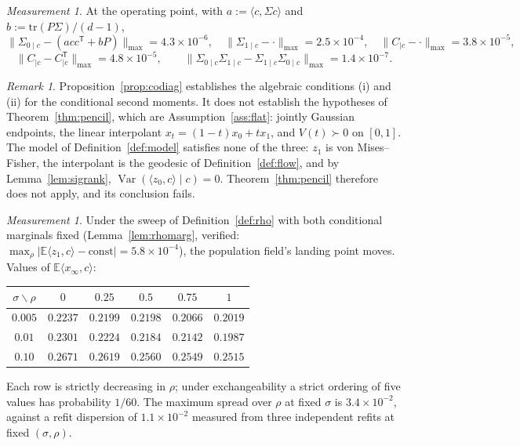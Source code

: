 \documentclass[11pt]{article}
\theoremstyle{definition}
\theoremstyle{remark}
\newtheorem{remark}[lemma]{Remark}
\newtheorem{measurement}[lemma]{Measurement}
\DeclareMathOperator{\Var}{Var}
\newcommand{\E}{\mathbb{E}}
\newcommand{\T}{\mathsf{T}}
\begin{document}
\begin{measurement}\label{meas:codiag}
At the operating point, with $a:=\langle c,\Sigma c\rangle$ and $b:=\mathrm{tr}(P\Sigma)/(d-1)$,
\[
\|\Sigma_{0\mid c}-(acc^{\T}+bP)\|_{\max}=4.3\times10^{-6},
\quad
\|\Sigma_{1\mid c}-\cdot\|_{\max}=2.5\times10^{-4},
\quad
\|C_{\mid c}-\cdot\|_{\max}=3.8\times10^{-5},
\]
\[
\|C_{\mid c}-C_{\mid c}^{\T}\|_{\max}=4.8\times10^{-5},
\qquad
\|\Sigma_{0\mid c}\Sigma_{1\mid c}-\Sigma_{1\mid c}\Sigma_{0\mid c}\|_{\max}=1.4\times10^{-7}.
\]
\end{measurement}

\begin{remark}\label{rem:nottransfer}
Proposition~\ref{prop:codiag} establishes the algebraic conditions (i) and (ii) for the
conditional second moments. It does not establish the hypotheses of Theorem~\ref{thm:pencil},
which are Assumption~\ref{ass:flat}: jointly Gaussian endpoints, the linear interpolant
$x_t=(1-t)x_0+tx_1$, and $V(t)\succ0$ on $[0,1]$. The model of Definition~\ref{def:model} satisfies
none of the three: $z_1$ is von Mises--Fisher, the interpolant is the geodesic of
Definition~\ref{def:flow}, and by Lemma~\ref{lem:sigrank}, $\Var(\langle z_0,c\rangle\mid c)=0$.
Theorem~\ref{thm:pencil} therefore does not apply, and its conclusion fails.
\end{remark}

\begin{measurement}\label{meas:nontransfer}
Under the sweep of Definition~\ref{def:rho} with both conditional marginals fixed
(Lemma~\ref{lem:rhomarg}, verified: $\max_\rho|\E\langle z_1,c\rangle-\text{const}|=5.8\times10^{-4}$),
the population field's landing point moves. Values of $\E\langle x_\infty,c\rangle$:
\begin{center}
\begin{tabular}{cccccc}
\toprule
$\sigma\backslash\rho$ & $0$ & $0.25$ & $0.5$ & $0.75$ & $1$\\
\midrule
$0.005$ & $0.2237$ & $0.2199$ & $0.2198$ & $0.2066$ & $0.2019$\\
$0.01$  & $0.2301$ & $0.2224$ & $0.2184$ & $0.2142$ & $0.1987$\\
$0.10$  & $0.2671$ & $0.2619$ & $0.2560$ & $0.2549$ & $0.2515$\\
\bottomrule
\end{tabular}
\end{center}
Each row is strictly decreasing in $\rho$; under exchangeability a strict ordering of five values
has probability $1/60$. The maximum spread over $\rho$ at fixed $\sigma$ is $3.4\times10^{-2}$,
against a refit dispersion of $1.1\times10^{-2}$ measured from three independent refits at fixed
$(\sigma,\rho)$.
\end{measurement}
\end{document}
